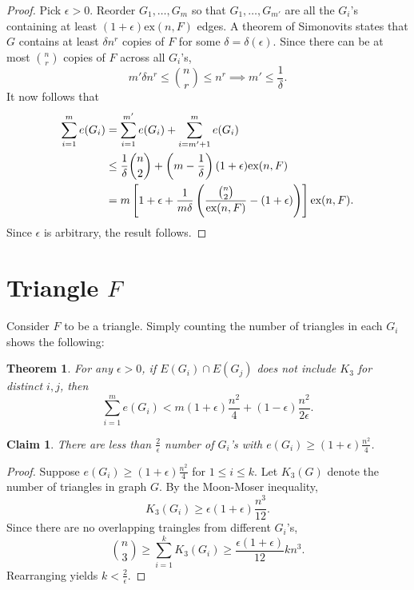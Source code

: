 \documentclass[12pt]{report}
\newtheorem{theorem}{Theorem}[chapter]
\newtheorem{claim}{Claim}
\begin{document}
\begin{proof}
  Pick $\epsilon > 0$. Reorder $G_1, \ldots, G_m$ so that $G_1, \ldots, G_{m'}$ are all the $G_i$'s
  containing at least $(1 + \epsilon)\text{ex}(n, F)$ edges. A theorem of Simonovits states that $G$
  contains at least $\delta n^r$ copies of $F$ for some $\delta = \delta(\epsilon)$. Since there can
  be at most $\binom{n}{r}$ copies of $F$ across all $G_i$'s, 
  \[
    m'\delta n^{r} \leq \binom{n}{r} \leq n^r \implies m' \leq \frac{1}{\delta}.
  \]
  It now follows that
  \begin{align*}
    \sum_{i = 1}^m e(G_i) 
    &= \sum_{i = 1}^{m'} e(G_i) + \sum_{i = m' + 1}^m e(G_i) \\
    &\leq \frac{1}{\delta}\binom{n}{2} + \left(m - \frac{1}{\delta}\right)(1 + \epsilon)\text{ex}(n, F) \\
    &= m\left[1 + \epsilon + \frac{1}{m\delta}\left(\frac{\binom{n}{2}}{\textnormal{ex}(n, F)} - (1 + \epsilon)\right)\right]\textnormal{ex}(n, F).
  \end{align*}
  Since $\epsilon$ is arbitrary, the result follows.
\end{proof}


\section{Triangle $F$}

Consider $F$ to be a triangle. Simply counting the number of triangles in each $G_i$ shows the
following:

\begin{theorem}
	For any $\epsilon > 0$, if $E(G_i) \cap E(G_j)$ does not include $K_3$ for distinct $i, j$, then
	\[
		\sum_{i = 1}^m  e(G_i) < m(1 + \epsilon)\frac{n^2}{4} + (1 - \epsilon)\frac{n^2}{2\epsilon}.
	\]
\end{theorem}

\begin{claim}
	There are less than $\frac{2}{\epsilon}$ number of $G_i$'s with $e(G_i) \geq (1 +
	\epsilon)\frac{n^2}{4}$.
\end{claim}

\begin{proof}
	Suppose $e(G_i) \geq (1 + \epsilon)\frac{n^2}{4}$ for $1\leq i \leq k$. Let $K_3(G)$ denote the
	number of triangles in graph $G$. By the Moon-Moser inequality,
	\[
		K_3(G_i) \geq \epsilon(1 + \epsilon)\frac{n^3}{12}.
	\]
	Since there are no overlapping traingles from different $G_i$'s, 
	\[
		\binom{n}{3} \geq \sum_{i = 1}^k K_3(G_i) \geq \frac{\epsilon(1 + \epsilon)}{12}kn^3.
	\]
	Rearranging yields $k < \frac{2}{\epsilon}$.
\end{proof}
\end{document}
